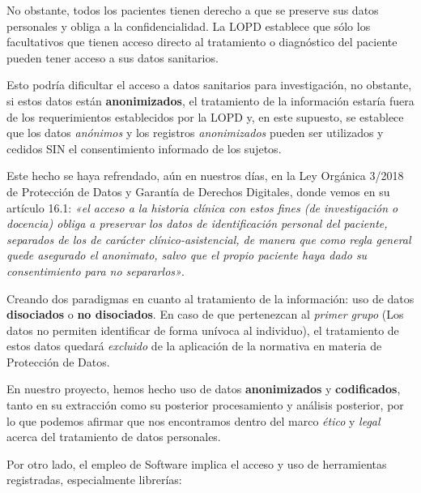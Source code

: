 No obstante, todos los pacientes tienen derecho a que se preserve sus datos personales y obliga a la confidencialidad. La LOPD establece que sólo los facultativos que tienen acceso directo al tratamiento o diagnóstico del paciente pueden tener acceso a sus datos sanitarios.

Esto podría dificultar el acceso a datos sanitarios para investigación, no obstante, si estos datos están \textbf{anonimizados}, el tratamiento de la información estaría fuera de los requerimientos establecidos por la LOPD y, en este supuesto, se establece que los datos \textit{anónimos} y los registros \textit{anonimizados} pueden ser utilizados y cedidos SIN el consentimiento informado de los sujetos\cite{GarridoElustondo2012InvestigacionPrimaria}.

Este hecho se haya refrendado, aún en nuestros días, en la Ley Orgánica 3/2018 de Protección de Datos y Garantía de Derechos Digitales, donde vemos en su artículo 16.1: \textit{«el acceso a la historia clínica con estos fines (de investigación o docencia) obliga a preservar los datos de identificación personal del paciente, separados de los de carácter clínico-asistencial, de manera que como regla general quede asegurado el anonimato, salvo que el propio paciente haya dado su consentimiento para no separarlos»}.

Creando dos paradigmas en cuanto al tratamiento de la información: uso de datos \textbf{disociados} o \textbf{no disociados}. En caso de que pertenezcan al \textit{primer grupo} (Los datos no permiten identificar de forma unívoca al individuo), el tratamiento de estos datos quedará \textit{excluido} de la aplicación de la normativa en materia de Protección de Datos.

En nuestro proyecto, hemos hecho uso de datos \textbf{anonimizados} y \textbf{codificados}, tanto en su extracción como su posterior procesamiento y análisis posterior, por lo que podemos afirmar que nos encontramos dentro del marco \textit{ético} y \textit{legal} acerca del tratamiento de datos personales.

Por otro lado, el empleo de Software implica el acceso y uso de herramientas registradas, especialmente librerías:


